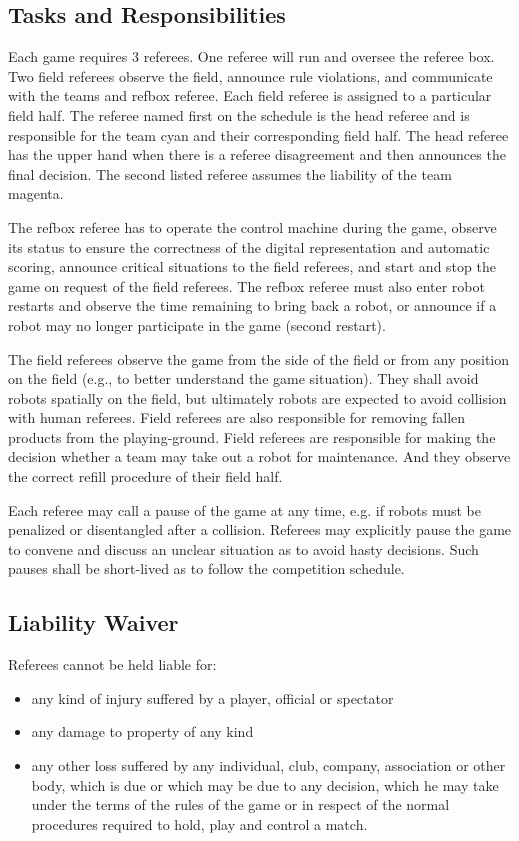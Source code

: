 \documentclass[12pt,twoside]{article}
\begin{document}
\subsection{Tasks and Responsibilities}
Each game requires 3 referees. One referee will run and oversee the
referee box. Two field referees observe the field, announce rule
violations, and communicate with the teams and refbox referee. Each
field referee is assigned to a particular field half. The referee
named first on the schedule is the head referee and is responsible for the 
team cyan and their corresponding field half. The head referee has
the upper hand when there is a referee disagreement and then announces
the final decision. The second listed referee assumes the liability of the 
team magenta.

The refbox referee has to operate the control machine during the game,
observe its status to ensure the correctness of the digital
representation and automatic scoring, announce critical situations to
the field referees, and start and stop the game on request of the
field referees. The refbox referee must also enter robot restarts and
observe the time remaining to bring back a robot, or announce if a
robot may no longer participate in the game (second restart).

The field referees observe the game from the side of the field or from
any position on the field (e.g., to better understand the game
situation). They shall avoid robots spatially on the field, but
ultimately robots are expected to avoid collision with human
referees. Field referees are also responsible for removing fallen
products from the playing-ground. Field referees are responsible for
making the decision whether a team may take out a robot for
maintenance. And they observe the correct refill procedure of their
field half.

Each referee may call a pause of the game at any time, e.g. if robots
must be penalized or disentangled after a collision. Referees may
explicitly pause the game to convene and discuss an unclear situation
as to avoid hasty decisions. Such pauses shall be short-lived as to
follow the competition schedule.

\subsection{Liability Waiver}
Referees cannot be held liable for:
\begin{itemize}
\item any kind of injury suffered by a player, official or spectator
\item any damage to property of any kind
\item any other loss suffered by any individual, club, company,
  association or other body, which is due or which may be due to any
  decision, which he may take under the terms of the rules of the game
  or in respect of the normal procedures required to hold, play and
  control a match.
\end{itemize}
\end{document}
